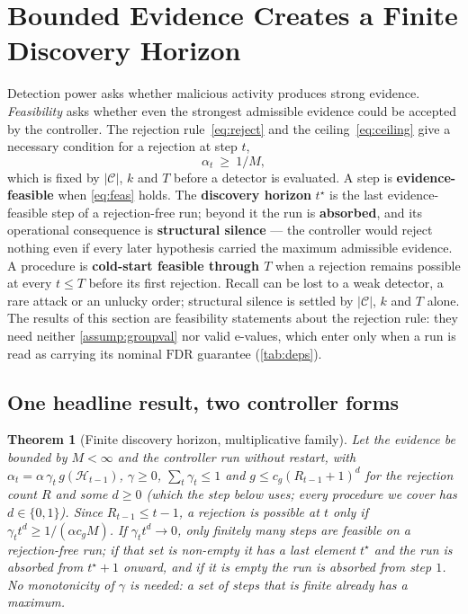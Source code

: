\documentclass[conference]{IEEEtran}
\newtheorem{theorem}{Theorem}
\newcommand{\Cal}{\mathcal{C}}
\newcommand{\nCal}{\lvert\Cal\rvert}
\newcommand{\ceil}{M}
\newcommand{\alphat}{\alpha_t}
\newcommand{\FDR}{\mathrm{FDR}}
\begin{document}
\section{Bounded Evidence Creates a Finite Discovery Horizon}\label{sec:feasibility}

Detection power asks whether malicious activity produces strong evidence. \emph{Feasibility} asks
whether even the strongest admissible evidence could be accepted by the controller. The rejection
rule~\eqref{eq:reject} and the ceiling~\eqref{eq:ceiling} give a necessary condition for a rejection at
step $t$,
\begin{equation}\label{eq:feas}
\alphat\ \ge\ 1/\ceil ,
\end{equation}
which is fixed by $\nCal$, $k$ and $T$ before a detector is evaluated. A step is \textbf{evidence-feasible} when \eqref{eq:feas} holds. The
\textbf{discovery horizon} $t^{\star}$ is the last evidence-feasible step of a rejection-free run;
beyond it the run is \textbf{absorbed}, and its operational consequence is \textbf{structural silence}
--- the controller would reject nothing even if every later hypothesis carried the maximum admissible
evidence. A procedure is \textbf{cold-start feasible through $T$} when a rejection remains possible at
every $t\le T$ before its first rejection. Recall can be lost to a weak detector, a rare attack or an
unlucky order; structural silence is settled by $\nCal$, $k$ and $T$ alone.
The results of this section are feasibility statements about the rejection rule: they need neither
\cref{assump:groupval} nor valid e-values, which enter only when a run is read as carrying its nominal
$\FDR$ guarantee (\cref{tab:deps}).

\subsection{One headline result, two controller forms}\label{sec:horizon}

\begin{theorem}[Finite discovery horizon, multiplicative family]\label{thm:family1}
Let the evidence be bounded by $\ceil<\infty$ and the controller run without restart, with
$\alphat=\alpha\,\gamma_t\,g(\mathcal H_{t-1})$, $\gamma\ge0$, $\sum_t\gamma_t\le1$ and
$g\le c_g(R_{t-1}+1)^d$ for the rejection count $R$ and some $d\ge0$ (which the step below uses; every
procedure we cover has $d\in\{0,1\}$). Since $R_{t-1}\le t-1$, a rejection is possible at
$t$ only if $\gamma_t t^d\ge1/(\alpha c_g\ceil)$. If $\gamma_t t^d\to0$, only finitely many steps are
feasible on a rejection-free run; if that set is non-empty it has a last element $t^{\star}$ and the run
is absorbed from $t^{\star}+1$ onward, and if it is empty the run is absorbed from step $1$. No monotonicity of $\gamma$ is needed: a set of steps that is
finite already has a maximum.
\end{theorem}
\end{document}
